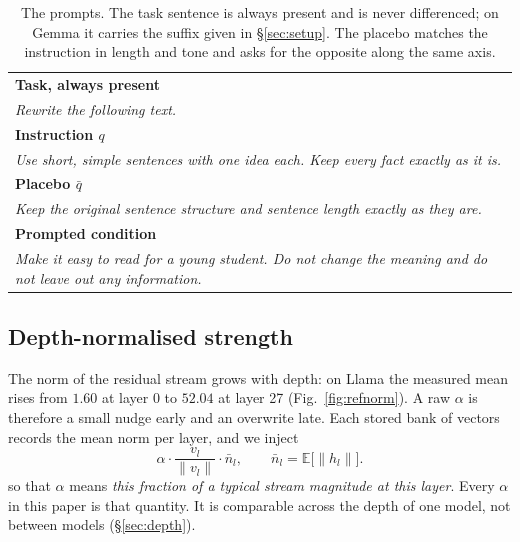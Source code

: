 \documentclass[aps,prb,reprint,nofootinbib,a4paper]{revtex4-2}
\begin{document}
\begin{table}[t]
\centering
\small
\caption{The prompts. The task sentence is always present and is never
differenced; on Gemma it carries the suffix given in \S\ref{sec:setup}. The
placebo matches the instruction in length and tone and asks for the opposite
along the same axis.}
\begin{tabular}{@{}p{}@{}}
\toprule
\textbf{Task, always present} \\
\emph{Rewrite the following text.} \\
\midrule
\textbf{Instruction $q$} \\
\emph{Use short, simple sentences with one idea each. Keep every fact exactly as
it is.} \\
\textbf{Placebo $\bar q$} \\
\emph{Keep the original sentence structure and sentence length exactly as they
are.} \\
\midrule
\textbf{Prompted condition} \\
\emph{Make it easy to read for a young student. Do not change the meaning and do
not leave out any information.} \\
\bottomrule
\end{tabular}
\label{tab:prompts}
\end{table}

\subsection{Depth-normalised strength}
\label{sec:scale}

The norm of the residual stream grows with depth: on Llama the measured mean
rises from $1.60$ at layer 0 to $52.04$ at layer 27 (Fig.~\ref{fig:refnorm}).
A raw $\alpha$ is therefore a small nudge early and an overwrite late. Each
stored bank of vectors records the mean norm per layer, and we inject
\begin{equation}
\alpha \cdot \frac{v_l}{\lVert v_l\rVert} \cdot \bar n_l,
\qquad \bar n_l = \mathbb{E}\bigl[\lVert h_l \rVert\bigr].
\label{eq:scale}
\end{equation}
so that $\alpha$ means \emph{this fraction of a typical stream magnitude at
this layer}. Every $\alpha$ in this paper is that quantity. It is comparable
across the depth of one model, not between models (\S\ref{sec:depth}).
\end{document}
